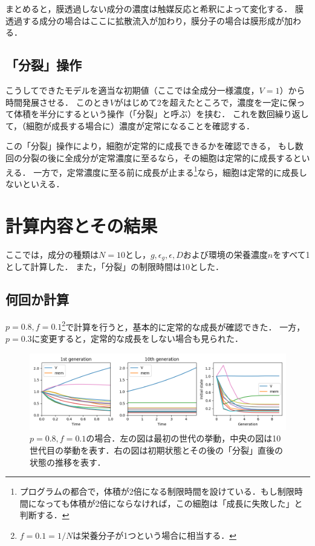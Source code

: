 \documentclass[a4paper,11pt]{jsarticle}
\begin{document}
まとめると，膜透過しない成分の濃度は触媒反応と希釈によって変化する．
膜透過する成分の場合はここに拡散流入が加わり，膜分子の場合は膜形成が加わる．

\subsection{「分裂」操作}
こうしてできたモデルを適当な初期値（ここでは全成分一様濃度，$V=1$）から時間発展させる．
このとき$V$がはじめて2を超えたところで，濃度を一定に保って体積を半分にするという操作（「分裂」と呼ぶ）を挟む．
これを数回繰り返して，（細胞が成長する場合に）濃度が定常になることを確認する．

この「分裂」操作により，細胞が定常的に成長できるかを確認できる，
もし数回の分裂の後に全成分が定常濃度に至るなら，その細胞は定常的に成長するといえる．
一方で，定常濃度に至る前に成長が止まる\footnote{プログラムの都合で，体積が2倍になる制限時間を設けている．もし制限時間になっても体積が2倍にならなければ，この細胞は「成長に失敗した」と判断する．}なら，細胞は定常的に成長しないといえる．

\section{計算内容とその結果}
ここでは，成分の種類は$N=10$とし，$g,\epsilon_g,\epsilon,D$および環境の栄養濃度$n$をすべて1として計算した．
また，「分裂」の制限時間は10とした．

\subsection{何回か計算}
$p=0.8, f=0.1$\footnote{$f=0.1=1/N$は栄養分子が1つという場合に相当する．}で計算を行うと，基本的に定常的な成長が確認できた．
一方，$p=0.3$に変更すると，定常的な成長をしない場合も見られた．

\begin{figure}[htbp]
  \centering
  \includegraphics[width=\columnwidth]{rand_05_01_1.png}
  \caption{$p=0.8,f=0.1$の場合．左の図は最初の世代の挙動，中央の図は10世代目の挙動を表す．右の図は初期状態とその後の「分裂」直後の状態の推移を表す．}
  \label{fig:rand_08_01}
\end{figure}
\end{document}
